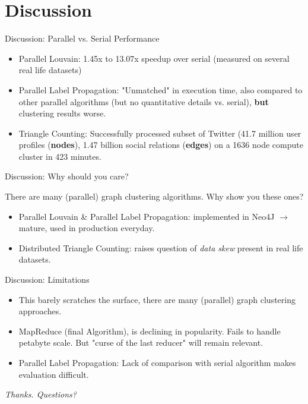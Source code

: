 \section{Discussion}

\begin{frame}{Discussion: Parallel vs. Serial Performance}
\begin{itemize}
\item<1-> Parallel Louvain: 1.45x to 13.07x speedup over serial (measured on several real life datasets)
\item<2-> Parallel Label Propagation: "Unmatched" in execution time, also compared to other parallel algorithms (but no quantitative details vs. serial), \textbf{but} clustering results worse.
\item<3-> Triangle Counting: Successfully processed subset of Twitter (41.7 million user profiles (\textbf{nodes}), 1.47 billion social relations (\textbf{edges}) on a 1636 node compute cluster in 423 minutes.
\end{itemize}
\end{frame}

\begin{frame}{Discussion: Why should you care?}

There are many (parallel) graph clustering algorithms. Why show you these ones?

\begin{itemize}
    \item<1-> Parallel Louvain \& Parallel Label Propagation: implemented in Neo4J $\rightarrow$ mature, used in production everyday.
    \item<2-> Distributed Triangle Counting: raises question of \emph{data skew} present in real life datasets.
\end{itemize}
\end{frame}

\begin{frame}{Discussion: Limitations}
\begin{itemize}
    \item<1-> This barely scratches the surface, there are many (parallel) graph clustering approaches.
    \item<2-> MapReduce (final Algorithm), is declining in popularity. Fails to handle petabyte scale. But "curse of the last reducer" will remain relevant.
    \item<3-> Parallel Label Propagation: Lack of comparison with serial algorithm makes evaluation difficult.
\end{itemize}
\end{frame}

\begin{frame}{}
  \centering \Large
  \emph{Thanks. Questions?}
\end{frame}
